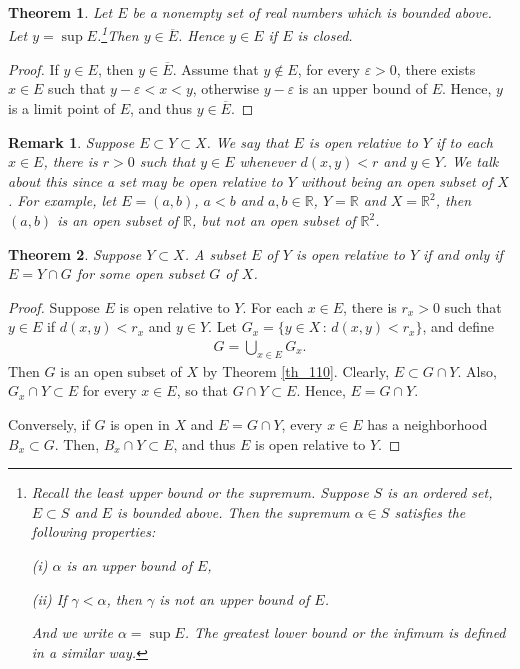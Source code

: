 \documentclass[11pt]{book}
\newtheorem{theorem}{Theorem}[chapter]
\newtheorem{remark}{Remark}[chapter]
\theoremstyle{definition}
\numberwithin{equation}{chapter}
\begin{document}
\begin{theorem}\label{th_113}
Let $E$ be a nonempty set of real numbers which is bounded above. Let $y = \sup E$.\footnote{Recall the {\em least upper bound} or the {\em supremum}. Suppose $S$ is an ordered set, $E \subset S$ and $E$ is bounded above. Then the supremum $\alpha \in S$ satisfies the following properties: \begin{enumerate*}
    \item[(i)] $\alpha$ is an upper bound of $E$,
    \item[(ii)] If $\gamma < \alpha$, then $\gamma$ is not an upper bound of $E$.
\end{enumerate*} And we write $\alpha = \sup E$. The {\em greatest lower bound} or the {\em infimum} is defined in a similar way.}Then $y \in \overline{E}$. Hence $y \in E$ if $E$ is closed.
\end{theorem}
\begin{proof}
If $y \in E$, then $y \in \overline{E}$. Assume that $y \notin E$, for every $\varepsilon > 0$, there exists $x \in E$ such that $y - \varepsilon < x < y$, otherwise $y - \varepsilon$ is an upper bound of $E$. Hence, $y$ is a limit point of $E$, and thus $y \in \overline{E}$.
\end{proof}

\begin{remark}
Suppose $E \subset Y \subset X$. We say that $E$ is {\em open relative} to $Y$ if to each $x \in E$, there is $r > 0$ such that $y \in E$ whenever $d(x,y) < r$ and $y \in Y$. We talk about this since a set may be open relative to $Y$ without being an open subset of $X$. For example, let $E = (a,b)$, $a < b$ and $a,b \in \mathbb{R}$, $Y = \mathbb{R}$ and $X = \mathbb{R}^2$, then $(a,b)$ is an open subset of $\mathbb{R}$, but not an open subset of $\mathbb{R}^2$.
\end{remark}

\medskip

\begin{theorem}
Suppose $Y \subset X$. A subset $E$ of $Y$ is open relative to $Y$ if and only if $E = Y \cap G$ for some open subset $G$ of $X$.
\end{theorem}
\begin{proof}
Suppose $E$ is open relative to $Y$. For each $x \in E$, there is $r_x > 0$ such that $y \in E$ if $d(x,y) < r_x$ and $y \in Y$. Let $G_x = \{y \in X \,:\, d(x,y) < r_x\}$, and define
\begin{align*}
    G = \bigcup_{x \in E} G_x.
\end{align*}
Then $G$ is an open subset of $X$ by Theorem \ref{th_110}. Clearly, $E \subset G \cap Y$. Also, $G_x \cap Y \subset E$ for every $x \in E$, so that $G \cap Y \subset E$. Hence, $E = G \cap Y$. 

Conversely, if $G$ is open in $X$ and $E = G \cap Y$, every $x \in E$ has a neighborhood $B_x \subset G$. Then, $B_x \cap Y \subset E$, and thus $E$ is open relative to $Y$.
\end{proof}
\end{document}

